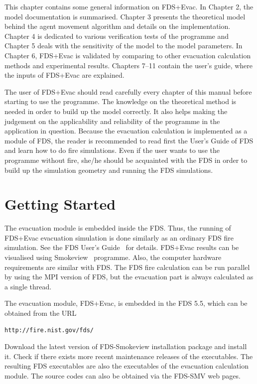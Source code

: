 \documentclass[12pt,a4paper,final,twoside]{stylevk}
\begin{document}
This chapter contains some general information on FDS+Evac.  In
Chapter 2, the model documentation is summarised. Chapter 3 presents
the theoretical model behind the agent movement algorithm and details
on the implementation.  Chapter 4 is dedicated to various verification
tests of the programme and Chapter 5 deals with the sensitivity of the
model to the model parameters.  In Chapter 6, FDS+Evac is validated
by comparing to other evacuation calculation methods and experimental
results.  Chapters 7--11 contain the user's guide, where the
inputs of FDS+Evac are explained.


The user of FDS+Evac should read carefully every chapter of this
manual before starting to use the programme.  The knowledge on the
theoretical method is needed in order to build up the model correctly.
It also helps making the judgement on the applicability and
reliability of the programme in the application in question.  Because
the evacuation calculation is implemented as a module of FDS, the
reader is recommended to read first the User's Guide of FDS and learn
how to do fire simulations.  Even if the user wants to use the
programme without fire, she/he should be acquainted with the FDS in
order to build up the simulation geometry and running the FDS
simulations.


\section{Getting Started}\label{Sec_GetStart}

\noindent The evacuation module is embedded inside the FDS.  Thus, the
running of FDS+Evac evacuation simulation is done similarly as an
ordinary FDS fire simulation.  See the FDS User's
Guide~\cite{FDS_UserGuide} for details.  FDS+Evac results can be
visualised using Smokeview~\cite{SV_UserGuide} programme. Also, the
computer hardware requirements are similar with FDS.  The FDS fire
calculation can be run parallel by using the MPI version of FDS, but
the evacuation part is always calculated as a single thread.


The evacuation module, FDS+Evac, is embedded in the FDS 5.5,
which can be obtained from the URL
\begin{verbatim}
http://fire.nist.gov/fds/
\end{verbatim}
Download the latest version of FDS-Smokeview installation package and
install it.  Check if there exists more recent maintenance releases of
the executables.  The resulting FDS executables are also the
executables of the evacuation calculation module.  The source codes
can also be obtained via the FDS-SMV web pages.
\end{document}
